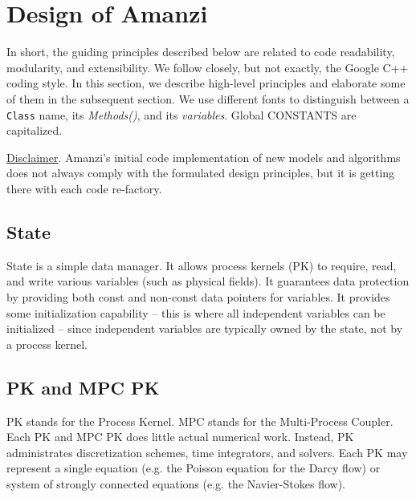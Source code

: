 
\section{Design of Amanzi}

In short, the guiding  principles described below are related to code readability,
modularity, and extensibility.
We follow closely, but not exactly, the Google C++ coding style.
In this section, we describe high-level principles and elaborate some of them 
in the subsequent section.
We use different fonts to distinguish between a {\tt Class} name, its {\it Methods()}, 
and its {\it variables}. 
Global {\rm CONSTANTS} are capitalized.

\underline{Disclaimer}. Amanzi's initial code implementation of new models 
and algorithms does not always comply with the formulated design principles, but 
it is getting there with each code re-factory.


\subsection{State}
State is a simple data manager. 
It allows process kernels (PK) to require, read, and write various variables (such as physical fields).
It guarantees data protection by providing both const and non-const data pointers for variables.
It provides some initialization capability -- this is where all independent variables can be 
initialized -- since independent variables are typically owned by the state, not by a process kernel.



\subsection{PK and MPC PK}
PK stands for the Process Kernel.
MPC stands for the Multi-Process Coupler.
Each PK and MPC PK does little actual numerical work.
Instead, PK administrates discretization schemes, time integrators, and solvers. 
Each PK may represent a single equation (e.g. the Poisson equation for the Darcy flow) 
or system of strongly connected equations (e.g. the Navier-Stokes flow).

